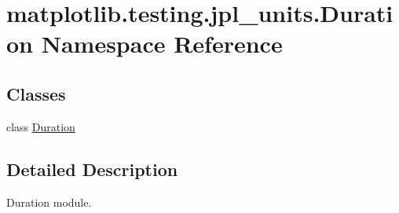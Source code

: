 \hypertarget{namespacematplotlib_1_1testing_1_1jpl__units_1_1Duration}{}\section{matplotlib.\+testing.\+jpl\+\_\+units.\+Duration Namespace Reference}
\label{namespacematplotlib_1_1testing_1_1jpl__units_1_1Duration}
\subsection*{Classes}
\begin{DoxyCompactItemize}
\item 
class \hyperlink{classmatplotlib_1_1testing_1_1jpl__units_1_1Duration_1_1Duration}{Duration}
\end{DoxyCompactItemize}


\subsection{Detailed Description}
\begin{DoxyVerb}Duration module.\end{DoxyVerb}
 
